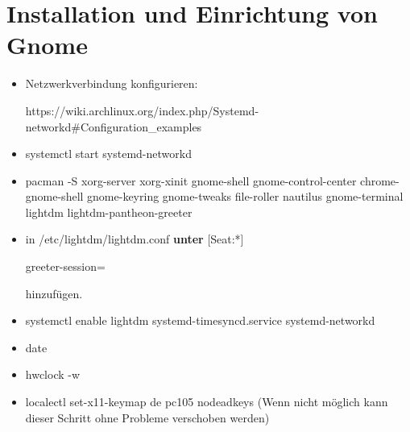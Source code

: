 \documentclass[11pt,a4paper]{article}
\begin{document}
\section{Installation und Einrichtung von Gnome}
\begin{itemize}
\item Netzwerkverbindung konfigurieren:

https://wiki.archlinux.org/index.php/Systemd-networkd\#Configuration\_examples
\item systemctl start systemd-networkd
\item pacman -S xorg-server xorg-xinit gnome-shell gnome-control-center chrome-gnome-shell gnome-keyring gnome-tweaks file-roller nautilus gnome-terminal lightdm lightdm-pantheon-greeter
\item in \glqq{}/etc/lightdm/lightdm.conf\grqq{} \textbf{unter} [Seat:*] 

greeter-session=\textcolor{red}{} 

hinzufügen.
\item systemctl enable lightdm systemd-timesyncd.service systemd-networkd
\item date
\item hwclock -w
\item localectl set-x11-keymap de pc105 nodeadkeys (Wenn nicht möglich kann dieser Schritt ohne Probleme verschoben werden)
\end{itemize}
\end{document}
